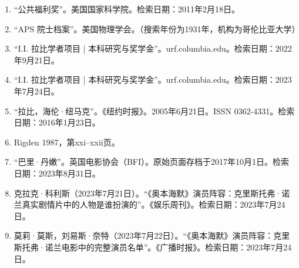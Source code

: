 \begin{enumerate}
\item “公共福利奖”。美国国家科学院。检索日期：2011年2月18日。
\item “APS 院士档案”。美国物理学会。（搜索年份为1931年，机构为哥伦比亚大学）
\item “I.I. 拉比学者项目 | 本科研究与奖学金”。urf.columbia.edu。检索日期：2022年9月21日。
\item “I.I. 拉比学者项目 | 本科研究与奖学金”。urf.columbia.edu。检索日期：2023年7月24日。
\item “拉比，海伦·纽马克”。《纽约时报》。2005年6月21日。ISSN 0362-4331。检索日期：2016年1月23日。
\item Rigden 1987，第xxi–xxii页。
\item “巴里·丹嫩”。英国电影协会（BFI）。原始页面存档于2017年10月1日。检索日期：2023年8月31日。
\item 克拉克·科利斯（2023年7月21日）。“《奥本海默》演员阵容：克里斯托弗·诺兰真实剧情片中的人物是谁扮演的”。《娱乐周刊》。检索日期：2023年7月24日。
\item 莫莉·莫斯，刘易斯·奈特（2023年7月22日）。“《奥本海默》演员阵容：克里斯托弗·诺兰电影中的完整演员名单”。《广播时报》。检索日期：2023年7月24日。
\end{enumerate}
